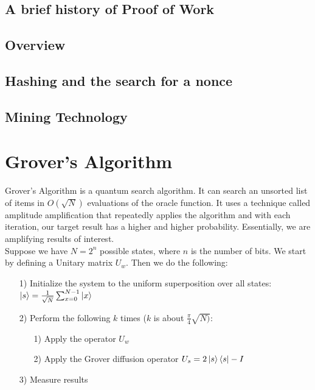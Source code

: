 \documentclass[11pt]{article} %
\begin{document}
\subsection{A brief history of Proof of Work}
\subsection{Overview}
\subsection{Hashing and the search for a nonce}
\subsection{Mining Technology}


\section{Grover's Algorithm}{}
Grover's Algorithm is a quantum search algorithm. It can search an unsorted list of items in $O(\sqrt{N})$ evaluations of the oracle function. It uses a technique called amplitude amplification that repeatedly applies the algorithm and with each iteration, our target result has a higher and higher probability. Essentially, we are amplifying results of interest.\\

\noindent Suppose we have $N = 2^{n}$ possible states, where $n$ is the number of bits. We start by defining a Unitary matrix $U_w$. Then we do the following:

\begin{itemize}

\item[1)] Initialize the system to the uniform superposition over all states:\\

$ \ket{s} = \frac{1}{\sqrt{N}}  \sum_{x = 0}^{N - 1} \ket{x}$

\item[2)] Perform the following $k$ times ($k$ is about $\frac{\pi}{4} \sqrt{N)}$:

\begin{itemize}
\item[1)] Apply the operator $U_w$
\item[2)] Apply the Grover diffusion operator $U_s = 2 \ket{s} \bra{s} - I$
\end{itemize}
\item[3)] Measure results
\end{itemize}
\end{document}
